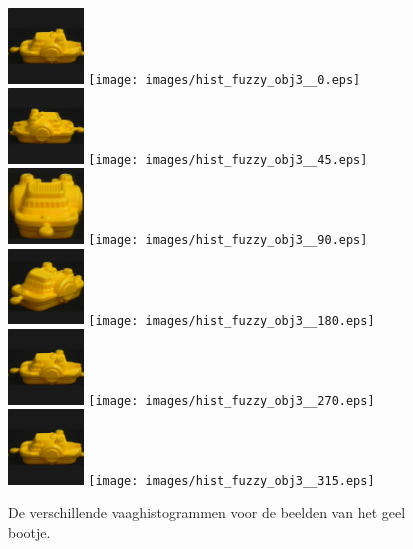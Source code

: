 \begin{figure}[tbp]
\begin{center}
\includegraphics[height=2cm]{coil/beeld-12.eps}
\texttt{[image: images/hist\_fuzzy\_obj3\_\_0.eps]}\hspace{1cm}
\includegraphics[height=2cm]{coil/beeld-13.eps}
\texttt{[image: images/hist\_fuzzy\_obj3\_\_45.eps]}\\[5pt]
\includegraphics[height=2cm]{coil/beeld-14.eps}
\texttt{[image: images/hist\_fuzzy\_obj3\_\_90.eps]}\hspace{1cm}
\includegraphics[height=2cm]{coil/beeld-15.eps}
\texttt{[image: images/hist\_fuzzy\_obj3\_\_180.eps]}\\[5pt]
\includegraphics[height=2cm]{coil/beeld-12.eps}
\texttt{[image: images/hist\_fuzzy\_obj3\_\_270.eps]}\hspace{1cm}
\includegraphics[height=2cm]{coil/beeld-12.eps}
\texttt{[image: images/hist\_fuzzy\_obj3\_\_315.eps]}
\caption{\label{fig:alle_vaaghistn_geel_bootje}De verschillende vaaghistogrammen voor de beelden 
van het geel bootje.}
\end{center}
\end{figure}

